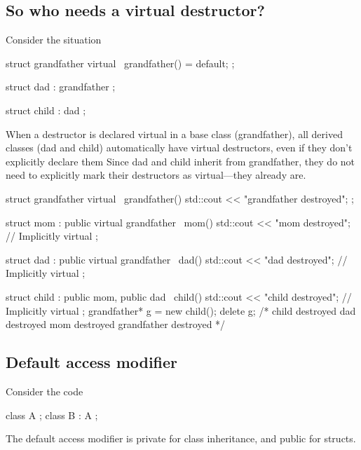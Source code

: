 \documentclass{report}
\begin{document}
    \bigbreak \noindent 
    \subsection{So who needs a virtual destructor?}
    \bigbreak \noindent 
    Consider the situation
    \bigbreak \noindent 
    \begin{cppcode}
        struct grandfather {
            virtual ~grandfather() = default;
        };


        struct dad : grandfather {
        };

        struct child : dad {
        };
    \end{cppcode}
    \bigbreak \noindent 
    When a destructor is declared virtual in a base class (grandfather), all derived classes (dad and child) automatically have virtual destructors, even if they don’t explicitly declare them
    \bigbreak \noindent 
    Since dad and child inherit from grandfather, they do not need to explicitly mark their destructors as virtual—they already are.
    \bigbreak \noindent 
    \begin{cppcode}
        struct grandfather {
            virtual ~grandfather() { std::cout << "grandfather destroyed\n"; }
        };

        struct mom : public virtual grandfather {
            ~mom() { std::cout << "mom destroyed\n"; } // Implicitly virtual
        };

        struct dad : public virtual grandfather {
            ~dad() { std::cout << "dad destroyed\n"; } // Implicitly virtual
        };

        struct child : public mom, public dad {
            ~child() { std::cout << "child destroyed\n"; } // Implicitly virtual
        };
        grandfather* g = new child();
        delete g;
        /* 
        child destroyed
        dad destroyed
        mom destroyed
        grandfather destroyed
        */
    \end{cppcode}

    \bigbreak \noindent 
    \subsection{Default access modifier} 
    \bigbreak \noindent 
    Consider the code
    \bigbreak \noindent 
    \begin{cppcode}
    class A {};
    class B : A {};
    \end{cppcode}
    \bigbreak \noindent 
    The default access modifier  is private for class inheritance, and public for structs.
\end{document}
